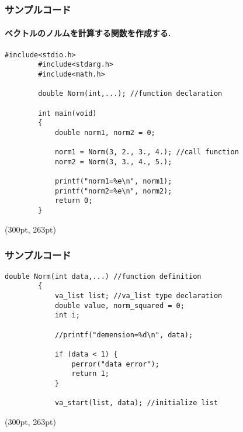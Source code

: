 \documentclass[dvipdfmx]{beamer}
\begin{document}
\begin{frame}[t, fragile, label=48]
    \frametitle{サンプルコード}
    \framesubtitle{ベクトルのノルムを計算する関数を作成する.}
    \vspace{-10pt}
    \begin{lstlisting}[gobble=8, caption=pra\_func.c]
        #include<stdio.h>
        #include<stdarg.h>
        #include<math.h>

        double Norm(int,...); //function declaration

        int main(void)
        {
            double norm1, norm2 = 0;

            norm1 = Norm(3, 2., 3., 4.); //call function
            norm2 = Norm(3, 3., 4., 5.);

            printf("norm1=%e\n", norm1);
            printf("norm2=%e\n", norm2);
            return 0;
        }
    \end{lstlisting}
    \begin{textblock*}{0.3\linewidth}(300pt, 263pt)
    \hyperlink{47}{}
    \space
    \hyperlink{49}{}
    \end{textblock*}
\end{frame}

\begin{frame}[t, fragile, label=49]
    \frametitle{サンプルコード}
    \begin{lstlisting}[gobble=8, firstnumber=18, caption=pra\_func.c]
        double Norm(int data,...) //function definition
        {
            va_list list; //va_list type declaration
            double value, norm_squared = 0;
            int i;

            //printf("demension=%d\n", data);

            if (data < 1) {
                perror("data error");
                return 1;
            }

            va_start(list, data); //initialize list

    \end{lstlisting}
    \begin{textblock*}{0.3\linewidth}(300pt, 263pt)
    \hyperlink{48}{}
    \space
    \hyperlink{50}{}
    \end{textblock*}
\end{frame}
\end{document}
